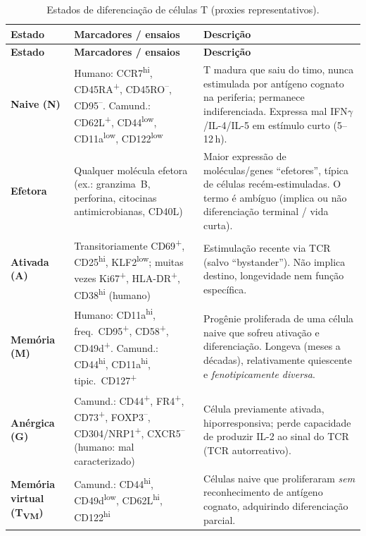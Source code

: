 \documentclass[11pt,a4paper]{article}
\newcommand{\up}[1]{\textsuperscript{#1}}          %
\newcommand{\tc}[1]{T\textsubscript{#1}}           %
\newcommand{\ifng}{IFN\ensuremath{\gamma}}
\begin{document}
\renewcommand{\arraystretch}{1.25}
\small
\begin{longtable}{L{2.4cm} L{6.2cm} L{6.6cm}}
\caption{Estados de diferenciação de células T (proxies representativos).}\label{tab:dif}\\
\toprule
\textbf{Estado} & \textbf{Marcadores / ensaios} & \textbf{Descrição} \\
\midrule
\endfirsthead
\toprule
\textbf{Estado} & \textbf{Marcadores / ensaios} & \textbf{Descrição} \\
\midrule
\endhead
\bottomrule
\endfoot
\textbf{Naive (N)} &
Humano: CCR7\up{hi}, CD45RA\up{+}, CD45RO\up{--}, CD95\up{--}.
Camund.: CD62L\up{+}, CD44\up{low}, CD11a\up{low}, CD122\up{low} &
T madura que saiu do timo, nunca estimulada por antígeno cognato na periferia; permanece
indiferenciada. Expressa mal \ifng{}/IL-4/IL-5 em estímulo curto (5--12\,h). \\
\textbf{Efetora} &
Qualquer molécula efetora (ex.: granzima~B, perforina, citocinas antimicrobianas, CD40L) &
Maior expressão de moléculas/genes ``efetores'', típica de células recém-estimuladas.
O termo é ambíguo (implica ou não diferenciação terminal / vida curta). \\
\textbf{Ativada (A)} &
Transitoriamente CD69\up{+}, CD25\up{hi}, KLF2\up{low}; muitas vezes Ki67\up{+}, HLA-DR\up{+},
CD38\up{hi} (humano) &
Estimulação recente via TCR (salvo ``bystander''). Não implica destino, longevidade nem
função específica. \\
\textbf{Memória (M)} &
Humano: CD11a\up{hi}, freq.\ CD95\up{+}, CD58\up{+}, CD49d\up{+}.
Camund.: CD44\up{hi}, CD11a\up{hi}, tipic.\ CD127\up{+} &
Progênie proliferada de uma célula naive que sofreu ativação e diferenciação. Longeva
(meses a décadas), relativamente quiescente e \emph{fenotipicamente diversa}. \\
\textbf{Anérgica (G)} &
Camund.: CD44\up{+}, FR4\up{+}, CD73\up{+}, FOXP3\up{--}, CD304/NRP1\up{+}, CXCR5\up{--}
(humano: mal caracterizado) &
Célula previamente ativada, hiporresponsiva; perde capacidade de produzir IL-2 ao sinal do
TCR (TCR autorreativo). \\
\textbf{Memória virtual (\tc{VM})} &
Camund.: CD44\up{hi}, CD49d\up{low}, CD62L\up{hi}, CD122\up{hi} &
Células naive que proliferaram \emph{sem} reconhecimento de antígeno cognato, adquirindo
diferenciação parcial. \\
\end{longtable}
\normalsize

\end{document}
